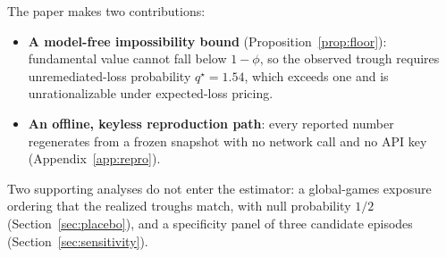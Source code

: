 The paper makes two contributions:
\begin{itemize}
\item \textbf{A model-free impossibility bound} (Proposition~\ref{prop:floor}):
  fundamental value cannot fall below $1-\phi$, so the observed trough requires
  unremediated-loss probability $q^{\star}=1.54$, which exceeds one and is
  unrationalizable under expected-loss pricing.
\item \textbf{An offline, keyless reproduction path}: every reported number regenerates
  from a frozen snapshot with no network call and no API key
  (Appendix~\ref{app:repro}).
\end{itemize}
Two supporting analyses do not enter the estimator: a global-games exposure ordering that
the realized troughs match, with null probability $1/2$ (Section~\ref{sec:placebo}), and a
specificity panel of three candidate episodes
(Section~\ref{sec:sensitivity}).

